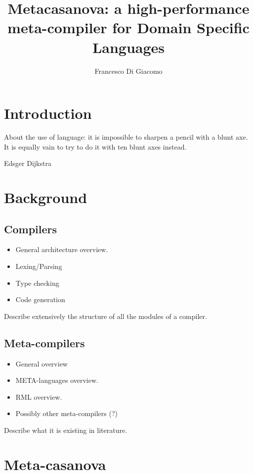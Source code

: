 \documentclass[8pt,a5paper]{extbook}
\author{Francesco Di Giacomo}
\title{Metacasanova: a high-performance meta-compiler for Domain Specific Languages}
\date { }
\begin{document}
\mainmatter
\maketitle

\tableofcontents



\chapter{Introduction}
\epigraph{About the use of language: it is impossible to sharpen a pencil with a blunt axe. It is equally vain to try to do it with ten blunt axes instead.}{Edsger Dijkstra}

\label{ch:introduction}
	

\chapter{Background}
\section{Compilers}

\begin{itemize}[noitemsep]
	\item General architecture overview.
	\item Lexing/Parsing
	\item Type checking
	\item Code generation
\end{itemize}

Describe extensively the structure of all the modules of a compiler.

\section{Meta-compilers}

\begin{itemize}[noitemsep]
	\item General overview
	\item META-languages overview.
	\item RML overview.
	\item Possibly other meta-compilers (?)
\end{itemize}

Describe what it is existing in literature.
	
\chapter{Meta-casanova}		
\end{document}
